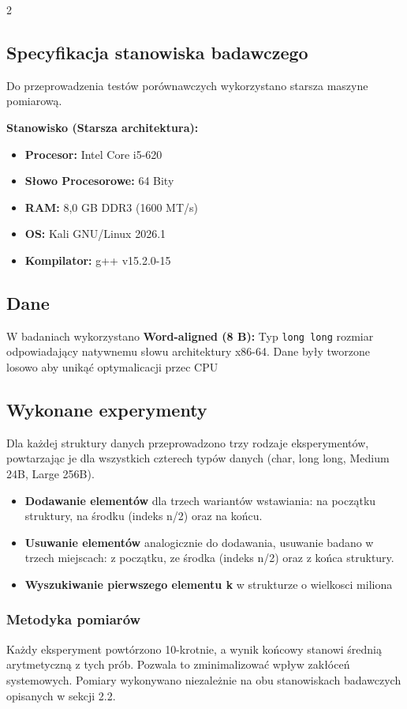 \documentclass[12pt,a4paper]{article}
\begin{document}
\begin{multicols}{2}
\subsection{Specyfikacja stanowiska badawczego}
Do przeprowadzenia testów porównawczych wykorzystano
starsza maszyne pomiarową.

\textbf{Stanowisko (Starsza architektura):}
\begin{itemize}[nosep]
    \item \textbf{Procesor:} Intel Core i5-620
    \item \textbf{Słowo Procesorowe: } 64 Bity
    \item \textbf{RAM:} 8,0 GB DDR3 (1600 MT/s)
    \item \textbf{OS:} Kali GNU/Linux 2026.1
    \item \textbf{Kompilator:} g++ v15.2.0-15
\end{itemize}

\subsection{Dane}
W badaniach wykorzystano \textbf{Word-aligned (8 B):} 
Typ \texttt{long long} rozmiar odpowiadający natywnemu słowu
architektury x86-64. Dane były tworzone losowo aby unikąć optymalicacji 
przec CPU


\subsection{Wykonane experymenty}
Dla każdej struktury danych przeprowadzono
trzy rodzaje eksperymentów,
powtarzając je dla wszystkich czterech
typów danych (char, long long, Medium 24B, Large 256B). 
\begin{itemize}
    \item \textbf{Dodawanie elementów} dla trzech wariantów wstawiania: na początku struktury, na środku (indeks n/2) oraz na końcu.
    \item \textbf{Usuwanie elementów} analogicznie do dodawania, usuwanie badano w trzech miejscach: z początku, ze środka (indeks n/2) oraz z końca struktury. 
    \item \textbf{Wyszukiwanie pierwszego elementu k} w strukturze o wielkosci miliona 
\end{itemize}
\subsubsection*{Metodyka pomiarów}
Każdy eksperyment powtórzono 10-krotnie, 
a wynik końcowy stanowi średnią arytmetyczną z tych prób. 
Pozwala to zminimalizować wpływ zakłóceń systemowych. 
Pomiary wykonywano niezależnie na obu stanowiskach badawczych opisanych w 
sekcji 2.2.

\end{multicols}
\end{document}
